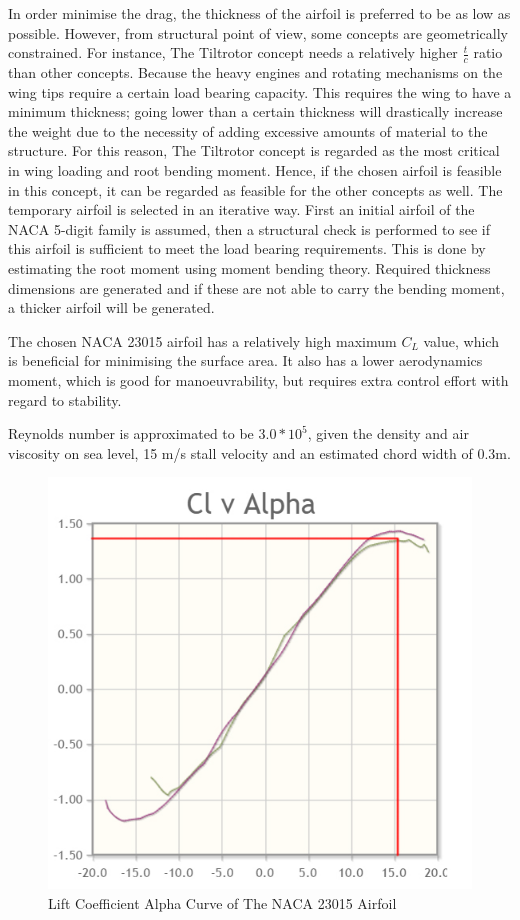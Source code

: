 In order minimise the drag, the thickness of the airfoil is preferred to be as low as possible. However, from structural point of view, some concepts are geometrically constrained. For instance, The Tiltrotor concept needs a relatively higher $\frac{t}{c}$ ratio than other concepts. Because the heavy engines and rotating mechanisms on the wing tips require a certain load bearing capacity. This requires the wing to have a minimum thickness; going lower than a certain thickness will drastically increase the weight due to the necessity of adding excessive amounts of material to the structure. For this reason, The Tiltrotor concept is regarded as the most critical in wing loading and root bending moment. Hence, if the chosen airfoil is feasible in this concept, it can be regarded as feasible for the other concepts as well.
The temporary airfoil is selected in an iterative way. First an initial airfoil of the NACA 5-digit family is assumed, then a structural check is performed to see if this airfoil is sufficient to meet the load bearing requirements. This is done by estimating the root moment using moment bending theory. Required thickness dimensions are generated and if these are not able to carry the bending moment, a thicker airfoil will be generated. 


The chosen NACA 23015 airfoil has a relatively high maximum $C_{L}$ value, which is beneficial for minimising the surface area. It also has a lower aerodynamics moment, which is good for manoeuvrability, but requires extra control effort with regard to stability. 

Reynolds number is approximated to be $3.0*10^{5}$, given the density and air viscosity on sea level, 15 m/s stall velocity and an estimated chord width of 0.3m.

\begin{figure}[htb]
    \centering
    \includegraphics[width=.475\textwidth]{PerformanceAnalysis/Figures/clplot.jpg}
    \caption{Lift Coefficient Alpha Curve of The NACA 23015 Airfoil}
    \label{fig:NACA23015}
\end{figure}


